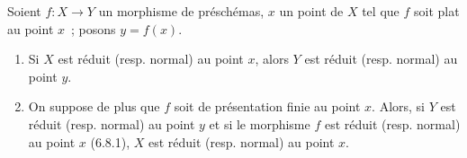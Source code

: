\begin{proposition}[11.3.13]
\label{IV.11.3.13-fr}
Soient $f:X\to Y$ un morphisme de préschémas, $x$ un point de $X$ tel que
$f$ soit plat au point $x$~; posons $y=f(x)$.
\begin{enumerate}[label=\emph{(\roman*)}]
\item Si $X$ est réduit (resp. normal) au point $x$, alors $Y$ est réduit
(resp. normal) au point $y$.
\item On suppose de plus que $f$ soit de présentation finie au point $x$.
Alors, si $Y$ est réduit (resp. normal) au point $y$ et si le morphisme $f$
est réduit (resp. normal) au point $x$ (6.8.1), $X$ est réduit (resp. normal)
au point $x$.
\end{enumerate}
\end{proposition}

